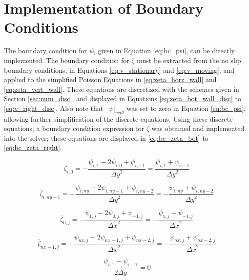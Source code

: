 \section{Implementation of Boundary Conditions}

	
The boundary condition for $\psi$, given in Equation \ref{eq:bc_psi}, can be directly implemented.  The boundary condition for $\zeta$ must be extracted from the no slip boundary conditions, in Equations \ref{eq:v_stationary} and \ref{eq:v_moving}, and applied to the simplified Poisson Equations in \ref{eq:zeta_horz_wall} and \ref{eq:zeta_vert_wall}. These equations are discretized with the schemes given in Section \ref{sec:num_disc}, and displayed in Equations \ref{eq:zeta_bot_wall_disc} to \ref{eq:v_right_disc}.  Also note that \ $\psi|_{wall}$ was set to zero in Equation \ref{eq:bc_psi}, allowing further simplification of the discrete equations.  Using these discrete equations, a boundary condition expression for $\zeta$ was obtained and implemented into the solver; these equations are displayed in \ref{eq:bc_zeta_bot} to \ref{eq:bc_zeta_right}.

\begin{equation}
\label{eq:zeta_bot_wall_disc} 
\overline{\zeta}_{i,0} = - \frac{\psi_{ i,1} - 2 \psi_{ i,0} + \psi_{ i,-1} }{{\Delta y}^2}
= \frac{\psi_{ i,1} + \psi_{ i,-1} }{{\Delta y}^2}
\end{equation}

\begin{equation}
\label{eq:zeta_top_wall_disc} 
\overline{\zeta}_{i,ny-1} = - \frac{\psi_{ i,ny} - 2 \psi_{ i,ny-1} + \psi_{ i,ny-2} }{{\Delta y}^2} = - \frac{\psi_{ i,ny} + \psi_{ i,ny-2} }{{\Delta y}^2}
\end{equation}

\begin{equation}
\label{eq:zeta_left_wall_disc} 
\overline{\zeta}_{0,j} = - \frac{\psi_{1,j} - 2 \psi_{0,j} + \psi_{-1,j} }{{\Delta x}^2} 
= - \frac{\psi_{1,j} + \psi_{-1,j} }{{\Delta x}^2} 
\end{equation}

\begin{equation}
\label{eq:zeta_right_wall_disc} 
\overline{\zeta}_{nx-1,j} = - \frac{\psi_{nx,j} - 2 \psi_{nx-1,j} + \psi_{nx-2,j} }{{\Delta x}^2} =  - \frac{\psi_{nx,j} + \psi_{nx-2,j} }{{\Delta x}^2} 
\end{equation}



\begin{equation}
\label{eq:v_bot_disc} 
\frac{\psi_{ i,1} - \psi_{ i,-1}}{2\Delta y} = 0
\end{equation}

